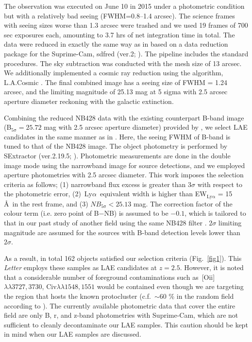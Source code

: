 \documentclass[letters,usenatbib]{mnras}
\def\lya{{\rm\,Ly$\alpha$}}
\def\oii{{\rm\,[O{\sc ii}]}}
\begin{document}
The observation was executed on June 10 in 2015 under a photometric condition 
but with a relatively bad seeing (FWHM=0.8--1.4 arcsec). The science frames with 
seeing sizes worse than 1.3 arcsec were trashed and we used 19 frames of 700 sec 
exposures each, amounting to 3.7 hrs of net integration time in total. The data 
were reduced in exactly the same way as in \citet{Shimakawa:2016} based on a data 
reduction package for the Suprime-Cam, {\sc sdfred} (ver.2; 
\citealt{Yagi:2002,Ouchi:2004}). The pipeline includes the standard procedures. 
The sky subtraction was conducted with the mesh size of 13 arcsec. We additionally 
implemented a cosmic ray reduction using the algorithm, L.A.Cosmic 
\citep{Dokkum:2011}. The final combined image has a seeing size of FWHM = 1.24 
arcsec, and the limiting magnitude of 25.13 mag at 5 sigma with 2.5 arcsec 
aperture diameter reckoning with the galactic extinction. 

Combining the reduced NB428 data with the existing counterpart B-band image 
(B$_\mathrm{5\sigma}=25.72$ mag with 2.5 arcsec aperture diameter) provided by 
\citet{Hayashi:2016}, we select LAE candidates in the same manner as in 
\citet{Shimakawa:2016}. Here, the seeing FWHM of B-band is tuned to that of the 
NB428 image. The object photometry is performed by SExtractor (ver.2.19.5; 
\citealt{Bertin:1996}). Photometric measurements are done in the double image mode 
using the narrowband image for source detections, and we employed aperture 
photometries with 2.5 arcsec diameter. This work imposes the selection criteria as 
follows; (1) narrowband flux excess is greater than $3\sigma$ with respect to the 
photometric error, (2) \lya\ equivalent width is higher than 
EW$_\mathrm{Ly\alpha}$ = 15 \AA\ in the rest frame, and (3) 
$NB_\mathrm{5\sigma}<25.13$ mag. The correction factor of the colour term (i.e. 
zero point of B$-$NB) is assumed to be $-0.1$, which is tailored to that in our 
past study of another field using the same NB428 filter \citep{Shimakawa:2016}. 
$2\sigma$ limiting magnitude are assumed for the sources with B-band detection 
levels lower than $2\sigma$. 

As a result, in total 162 objects satisfied our selection criteria 
(Fig.~\ref{fig1}). This {\it Letter} employs these samples as LAE candidates at 
$z=2.5$. However, it is noted that a considerable number of foreground 
contaminations such as \oii$\lambda\lambda3727,3730$, 
C{\sc iv}$\lambda\lambda1548,1551$ would be contained even though we are targeting 
the region that hosts the known protocluster (c.f.\ $\sim60$ \% in the random 
field according to \citealt{Sobral:2016}). The currently available photometric 
data that cover the entire field are only B, r, and z-band photometries with 
Suprime-Cam, which are not sufficient to cleanly decontaminate our LAE samples. 
This caution should be kept in mind when our LAE samples are discussed.
\end{document}
